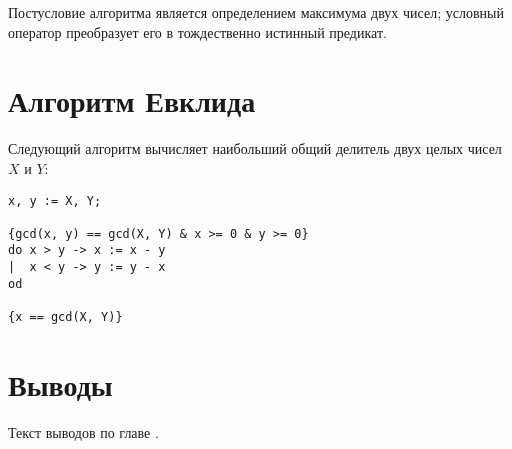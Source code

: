 Постусловие алгоритма является определением максимума двух чисел; условный оператор преобразует его 
в тождественно истинный предикат. 

\section{Алгоритм Евклида}
Следующий алгоритм вычисляет наибольший общий делитель двух целых чисел $X$ и $Y$:
\begin{BVerbatim}
x, y := X, Y;

{gcd(x, y) == gcd(X, Y) & x >= 0 & y >= 0}
do x > y -> x := x - y
|  x < y -> y := y - x
od

{x == gcd(X, Y)}
\end{BVerbatim}



\section{Выводы} \label{ch4:conclusion}
Текст выводов по главе \thechapter.

%
